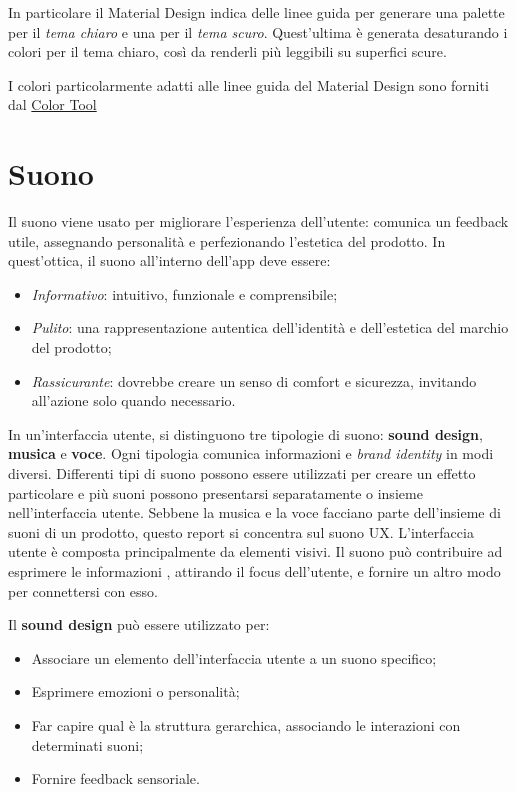 \documentclass[12pt, a4paper]{report}
\begin{document}
		In particolare il Material Design indica delle linee guida per generare una palette per il \textit{tema chiaro} e una per il \textit{tema scuro}. Quest'ultima è generata desaturando i colori per il tema chiaro, così da renderli più leggibili su superfici scure.

		I colori particolarmente adatti alle linee guida del Material Design sono forniti dal \href{https://material.io/resources/color/#!/?view.left=0&view.right=0&primary.color=6002ee}{Color Tool} \cite{color_tool}

   \section{Suono}
   	    Il suono viene usato per migliorare l'esperienza dell'utente: comunica un feedback utile, assegnando personalità e
   	    perfezionando l’estetica del prodotto. In quest’ottica, il suono all’interno dell’app deve essere:
   	    \begin{itemize}
   		    \item \textit{Informativo}: intuitivo, funzionale e comprensibile;
   		    \item \textit{Pulito}: una rappresentazione autentica dell'identità e dell'estetica del marchio del prodotto;
   		    \item \textit{Rassicurante}: dovrebbe creare un senso di comfort e sicurezza, invitando all'azione solo quando necessario.
   	    \end{itemize}
   	    In un'interfaccia utente, si distinguono tre tipologie di suono: \textbf{sound design}, \textbf{musica} e \textbf{voce}. Ogni tipologia comunica informazioni e \textit{brand identity} in modi diversi.
   	    Differenti tipi di suono possono essere utilizzati per creare	un effetto 	particolare e più suoni possono presentarsi separatamente o insieme nell’interfaccia utente. Sebbene la musica e la voce
   	    facciano parte dell’insieme di suoni di un prodotto, questo report si concentra sul suono UX. L'interfaccia utente è composta principalmente da elementi visivi. Il suono può contribuire ad esprimere le informazioni
   	    , attirando il focus dell’utente, e fornire un altro modo per connettersi con esso.


   	    Il \textbf{sound design} può essere utilizzato per:
    	\begin{itemize}
    		\item Associare un elemento dell'interfaccia utente a un suono specifico;
    		\item Esprimere emozioni o personalità;
    		\item Far capire qual è la struttura gerarchica, associando le interazioni con determinati suoni;
    		\item Fornire feedback sensoriale.
    	\end{itemize}
\end{document}
